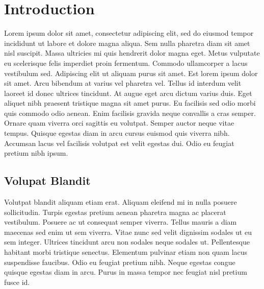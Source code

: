 \documentclass[12pt,a4paper,oneside]{book}
\begin{document}





\normalsize
\mdseries

\tableofcontents

\listoffigures

\newpage


\doublespacing
\frenchspacing

\setcounter{page}{1}

\chapter{Introduction}

Lorem ipsum dolor sit amet, consectetur adipiscing elit, sed do eiusmod tempor incididunt ut labore et dolore magna aliqua. Sem nulla pharetra diam sit amet nisl suscipit. Massa ultricies mi quis hendrerit dolor magna eget. Metus vulputate eu scelerisque felis imperdiet proin fermentum. Commodo ullamcorper a lacus vestibulum sed. Adipiscing elit ut aliquam purus sit amet. Est lorem ipsum dolor sit amet. Arcu bibendum at varius vel pharetra vel. Tellus id interdum velit laoreet id donec ultrices tincidunt. At augue eget arcu dictum varius duis. Eget aliquet nibh praesent tristique magna sit amet purus. Eu facilisis sed odio morbi quis commodo odio aenean. Enim facilisis gravida neque convallis a cras semper. Ornare quam viverra orci sagittis eu volutpat. Semper auctor neque vitae tempus. Quisque egestas diam in arcu cursus euismod quis viverra nibh. Accumsan lacus vel facilisis volutpat est velit egestas dui. Odio eu feugiat pretium nibh ipsum.

\section{Volupat Blandit}

Volutpat blandit aliquam etiam erat. Aliquam eleifend mi in nulla posuere sollicitudin. Turpis egestas pretium aenean pharetra magna ac placerat vestibulum. Posuere ac ut consequat semper viverra. Tellus mauris a diam maecenas sed enim ut sem viverra. Vitae nunc sed velit dignissim sodales ut eu sem integer. Ultrices tincidunt arcu non sodales neque sodales ut. Pellentesque habitant morbi tristique senectus. Elementum pulvinar etiam non quam lacus suspendisse faucibus. Odio eu feugiat pretium nibh. Neque egestas congue quisque egestas diam in arcu. Purus in massa tempor nec feugiat nisl pretium fusce id.
\end{document}

